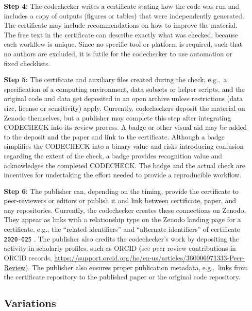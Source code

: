\documentclass[12pt]{article}
\begin{document}
\textbf{Step 4:} The codechecker writes a certificate stating how the
code was run and includes a copy of outputs (figures or tables) that
were independently generated.  The certificate may include
recommendations on how to improve the material.  The free text in the
certificate can describe exactly what was checked, because each
workflow is unique.  Since no specific tool or platform is required,
such that no authors are excluded, it is futile for the
codechecker to use automation or fixed checklists.

\textbf{Step 5:} The certificate and auxiliary files created during
the check, e.g.,~a specification of a computing environment, data
subsets or helper scripts, and the original code and data get
deposited in an open archive unless restrictions (data size, license
or sensitivity) apply.  Currently, codecheckers deposit the material
on Zenodo themselves, but a publisher may complete this step after
integrating CODECHECK into its review process.  A badge or other
visual aid may be added to the deposit and the paper and link to the
certificate.  Although a badge simplifies the CODECHECK into a binary
value and risks introducing confusion regarding the extent of the
check, a badge provides recognition value and acknowledges the
completed CODECHECK.  The badge and the actual check are incentives
for undertaking the effort needed to provide a reproducible workflow.

\textbf{Step 6:} The publisher can, depending on the timing, provide
the certificate to peer-reviewers or editors or publish it and link
between certificate, paper, and any repositories. Currently, the
codechecker creates these connections on Zenodo. They appear as links
with a relationship type on the Zenodo landing page for a certificate,
e.g., the ``related identifiers'' and ``alternate identifiers'' of
certificate \texttt{2020-025} \cite{cert-2020-025}.  The publisher
also credits the codechecker's work by depositing the activity
in scholarly profiles, such as ORCID (see peer review contributions in
ORCID records,
\url{https://support.orcid.org/hc/en-us/articles/360006971333-Peer-Review}).
The publisher also ensures proper publication metadata, e.g.,~links
from the certificate repository to the published paper or the original
code repository.

\subsection*{Variations}\label{variations}
\end{document}
